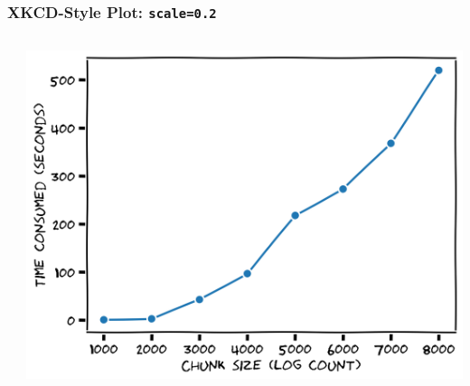 \documentclass[xcolor={svgnames}]{beamer}
\newcommand{\pyfile}[2][]{}
\begin{document}
\begin{frame}[t,fragile]
    \frametitle{XKCD-Style Plot: \texttt{scale=0.2}}
    \vspace{-2mm}
    \begin{columns}[T]
        \begin{column}{0.49\textwidth}
            \pyfile[style=footnotesize]{examples/xkcd-4.py}
        \end{column}
        \begin{column}{0.51\textwidth}
            \includegraphics[width=\textwidth]{img/xkcd-4.png}
        \end{column}
    \end{columns}
\end{frame}
\end{document}
